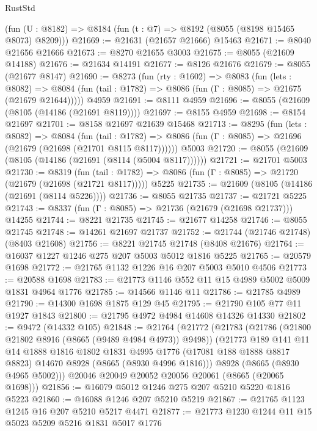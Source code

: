 \begin{lexlean}{RustStd}
\begin{coremodule}
    (fun (U : @8182) => @8184 (fun (t : @7) => @8192 (@8055 (@8198 @15465 @8073) @8209)))
@21669 := @21631 (@21657 @21666) @15463
@21671 := @8040 @21656 @21666
@21673 := @8270 @21655 @3003
@21675 := @8055 (@21609 @14188)
@21676 := @21634 @14191
@21677 := @8126 @21676
@21679 := @8055 (@21677 @8147)
@21690 := @8273
    (fun (rty : @1602) =>
    @8083
      (fun (lets : @8082) =>
      @8084 (fun (tail : @1782) => @8086 (fun (Γ : @8085) => @21675 (@21679 @21644)))))
    @4959
@21691 := @8111 @4959
@21696 := @8055 (@21609 (@8105 (@14186 (@21691 @8119))))
@21697 := @8155 @4959
@21698 := @8154 @21697
@21701 := @8158 @21697 @21639 @15468
@21713 := @8295
    (fun (lets : @8082) =>
    @8084
      (fun (tail : @1782) =>
      @8086 (fun (Γ : @8085) => @21696 (@21679 (@21698 (@21701 @8115 @8117))))))
    @5003
@21720 := @8055 (@21609 (@8105 (@14186 (@21691 (@8114 (@5004 @8117))))))
@21721 := @21701 @5003
@21730 := @8319
    (fun (tail : @1782) => @8086 (fun (Γ : @8085) => @21720 (@21679 (@21698 (@21721 @8117)))))
    @5225
@21735 := @21609 (@8105 (@14186 (@21691 (@8114 @5226))))
@21736 := @8055 @21735
@21737 := @21721 @5225
@21743 := @8337 (fun (Γ : @8085) => @21736 (@21679 (@21698 @21737))) @14255
@21744 := @8221 @21735
@21745 := @21677 @14258
@21746 := @8055 @21745
@21748 := @14261 @21697 @21737
@21752 := @21744 (@21746 @21748) (@8403 @21608)
@21756 := @8221 @21745 @21748 (@8408 @21676)
@21764 := @16037 @1227 @1246 @275 @207 @5003 @5012 @1816 @5225
@21765 := @20579 @1698
@21772 := @21765 @1132 @1226 @16 @207 @5003 @5010 @4506
@21773 := @20588 @1698
@21783 := @21773 @1146 @552 @11 @15 @4989 @5002 @5009 @1831 @4964 @1776
@21785 := @14566 @1146 @11
@21786 := @21785 @4989
@21790 := @14300 @1698 @1875 @129 @45
@21795 := @21790 @105 @77 @11 @1927 @1843
@21800 := @21795 @4972 @4984 @14608 @14326 @14330
@21802 := @9472 (@14332 @105)
@21848 := @21764
    (@21772
      (@21783
        (@21786 (@21800 @21802 @8916 (@8665 (@9489 @4984 @4973)) @9498))
        (@21773
          @189
          @141
          @11
          @14
          @1888
          @1816
          @1802
          @1831
          @4995
          @1776
          (@17081 @188 @1888 @8817 @8823)
          @14670
          @8928
          (@8665 (@8930 @4996 @1816)))
        @8928
        (@8665 (@8930 @4965 @5002)))
      @20046
      @20049
      @20052
      @20056
      @20061
      (@8665 (@20065 @1698)))
@21856 := @16079 @5012 @1246 @275 @207 @5210 @5220 @1816 @5223
@21860 := @16088 @1246 @207 @5210 @5219
@21867 := @21765 @1123 @1245 @16 @207 @5210 @5217 @4471
@21877 := @21773 @1230 @1244 @11 @15 @5023 @5209 @5216 @1831 @5017 @1776

\end{coremodule}
\end{lexlean}
